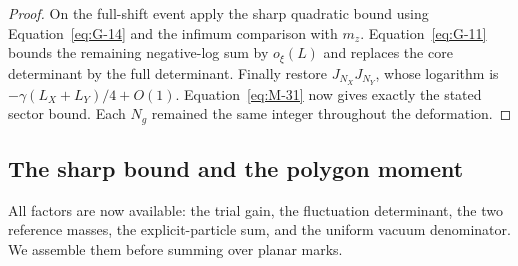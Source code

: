 \begin{proof}
On the full-shift event apply the sharp quadratic bound using
Equation~\eqref{eq:G-14} and the infimum comparison with $m_z$.
Equation~\eqref{eq:G-11} bounds the remaining negative-log sum by
$o_\xi(L)$ and replaces the core determinant by the full determinant.
Finally restore $J_{N_X}J_{N_Y}$, whose logarithm is
$-\gamma(L_X+L_Y)/4+O(1)$. Equation~\eqref{eq:M-31} now gives
exactly the stated sector bound. Each $N_g$ remained the same integer
throughout the deformation.
\end{proof}

\subsection{The sharp bound and the polygon moment}

All factors are now available: the trial gain, the fluctuation determinant,
the two reference masses, the explicit-particle sum, and the uniform
vacuum denominator. We assemble them before summing over planar marks.

